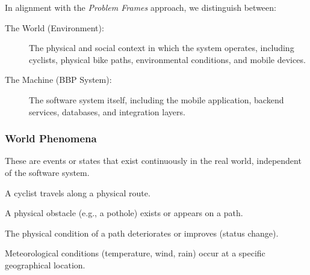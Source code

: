 In alignment with the \textit{Problem Frames} approach, we distinguish between:
\begin{description}
    \item[The World (Environment):] The physical and social context in which the system operates, including cyclists, physical bike paths, environmental conditions, and mobile devices.
    \item[The Machine (BBP System):] The software system itself, including the mobile application, backend services, databases, and integration layers.
\end{description}

\subsubsection{World Phenomena}
These are events or states that exist continuously in the real world, independent of the software system.

\begin{enumerate}[label=\textbf{[WP\arabic*]}:]
    \item A cyclist travels along a physical route.
    \item A physical obstacle (e.g., a pothole) exists or appears on a path.
    \item The physical condition of a path deteriorates or improves (status change).
    \item Meteorological conditions (temperature, wind, rain) occur at a specific geographical location.
\end{enumerate}

